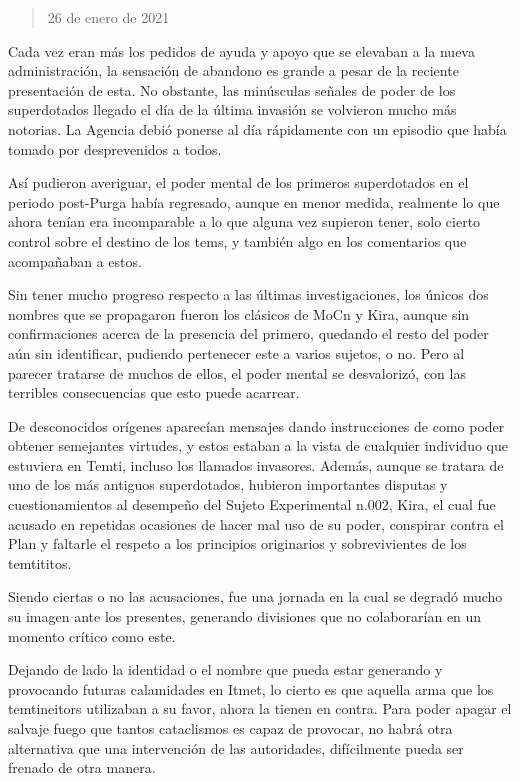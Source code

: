 \documentclass[
]{book}
\begin{document}
\begin{quote}
26 de enero de 2021
\end{quote}

Cada vez eran más los pedidos de ayuda y apoyo que se elevaban a la nueva administración, la sensación de abandono es grande a pesar de la reciente presentación de esta. No obstante, las minúsculas señales de poder de los superdotados llegado el día de la última invasión se volvieron mucho más notorias. La Agencia debió ponerse al día rápidamente con un episodio que había tomado por desprevenidos a todos.

Así pudieron averiguar, el poder mental de los primeros superdotados en el periodo post-Purga había regresado, aunque en menor medida, realmente lo que ahora tenían era incomparable a lo que alguna vez supieron tener, solo cierto control sobre el destino de los tems, y también algo en los comentarios que acompañaban a estos.

Sin tener mucho progreso respecto a las últimas investigaciones, los únicos dos nombres que se propagaron fueron los clásicos de MoCn y Kira, aunque sin confirmaciones acerca de la presencia del primero, quedando el resto del poder aún sin identificar, pudiendo pertenecer este a varios sujetos, o no. Pero al parecer tratarse de muchos de ellos, el poder mental se desvalorizó, con las terribles consecuencias que esto puede acarrear.

De desconocidos orígenes aparecían mensajes dando instrucciones de como poder obtener semejantes virtudes, y estos estaban a la vista de cualquier individuo que estuviera en Temti, incluso los llamados invasores. Además, aunque se tratara de uno de los más antiguos superdotados, hubieron importantes disputas y cuestionamientos al desempeño del Sujeto Experimental n.002, Kira, el cual fue acusado en repetidas ocasiones de hacer mal uso de su poder, conspirar contra el Plan y faltarle el respeto a los principios originarios y sobrevivientes de los temtititos.

Siendo ciertas o no las acusaciones, fue una jornada en la cual se degradó mucho su imagen ante los presentes, generando divisiones que no colaborarían en un momento crítico como este.

Dejando de lado la identidad o el nombre que pueda estar generando y provocando futuras calamidades en Itmet, lo cierto es que aquella arma que los temtineitors utilizaban a su favor, ahora la tienen en contra. Para poder apagar el salvaje fuego que tantos cataclismos es capaz de provocar, no habrá otra alternativa que una intervención de las autoridades, difícilmente pueda ser frenado de otra manera.
\end{document}
